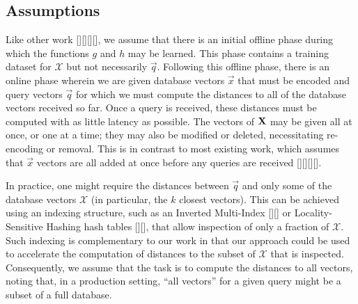 



\subsection{Assumptions}

Like other work [][][][], we assume that there is an initial offline phase during which the functions $g$ and $h$ may be learned. This phase contains a training dataset for $\mathcal{X}$ but not necessarily $\vec{q}$. Following this offline phase, there is an online phase wherein we are given database vectors $\vec{x}$ that must be encoded and query vectors $\vec{q}$ for which we must compute the distances to all of the database vectors received so far. Once a query is received, these distances must be computed with as little latency as possible. The vectors of $\mathbf{X}$ may be given all at once, or one at a time; they may also be modified or deleted, necessitating re-encoding or removal. This is in contrast to most existing work, which assumes that $\vec{x}$ vectors are all added at once before any queries are received [][][][].

In practice, one might require the distances between $\vec{q}$ and only some of the database vectors $\mathcal{X}$ (in particular, the $k$ closest vectors). This can be achieved using an indexing structure, such as an Inverted Multi-Index [][] or Locality-Sensitive Hashing hash tables [][], that allow inspection of only a fraction of $\mathcal{X}$. Such indexing is complementary to our work in that our approach could be used to accelerate the computation of distances to the subset of $\mathcal{X}$ that is inspected. Consequently, we assume that the task is to compute the distances to all vectors, noting that, in a production setting, ``all vectors'' for a given query might be a subset of a full database.

